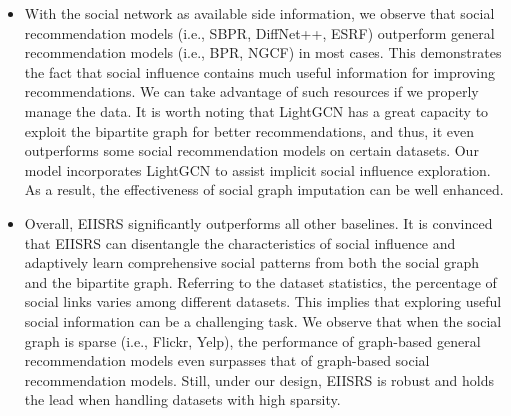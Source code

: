 \documentclass[letterpaper]{article} %
\begin{document}
\begin{itemize}
    \item With the social network as available side information, we observe that social recommendation models (i.e., SBPR, DiffNet++, ESRF) outperform general recommendation models (i.e., BPR, NGCF) in most cases. This demonstrates the fact that social influence contains much useful information for improving recommendations. We can take advantage of such resources if we properly manage the data. It is worth noting that LightGCN has a great capacity to exploit the bipartite graph for better recommendations, and thus, it even outperforms some social recommendation models on certain datasets. Our model incorporates LightGCN to assist implicit social influence exploration. As a result, the effectiveness of social graph imputation can be well enhanced.
    \item Overall, EIISRS significantly outperforms all other baselines. It is convinced that EIISRS can disentangle the characteristics of social influence and adaptively learn comprehensive social patterns from both the social graph and the bipartite graph. Referring to the dataset statistics, the percentage of social links varies among different datasets. This implies that exploring useful social information can be a challenging task. We observe that when the social graph is sparse (i.e., Flickr, Yelp), the performance of graph-based general recommendation models even surpasses that of graph-based social recommendation models. Still, under our design, EIISRS is robust and holds the lead when handling datasets with high sparsity.
\end{itemize} 
\end{document}

